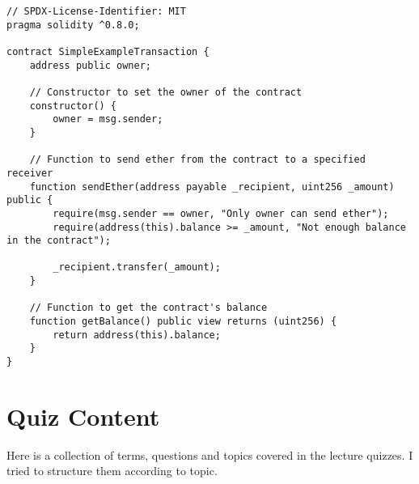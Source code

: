 \documentclass{article}
\begin{document}
\begin{verbatim}
// SPDX-License-Identifier: MIT
pragma solidity ^0.8.0;

contract SimpleExampleTransaction {
    address public owner;

    // Constructor to set the owner of the contract
    constructor() {
        owner = msg.sender;
    }

    // Function to send ether from the contract to a specified receiver 
    function sendEther(address payable _recipient, uint256 _amount) public {
        require(msg.sender == owner, "Only owner can send ether");
        require(address(this).balance >= _amount, "Not enough balance in the contract");

        _recipient.transfer(_amount);
    }

    // Function to get the contract's balance
    function getBalance() public view returns (uint256) {
        return address(this).balance;
    }
}

\end{verbatim}



\section{Quiz Content}
Here is a collection of terms, questions and topics covered in the lecture quizzes. I tried to structure them according to topic.
\end{document}
